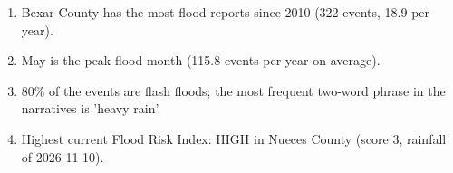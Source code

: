 \begin{enumerate}
\item Bexar County has the most flood reports since 2010 (322 events, 18.9 per year).
\item May is the peak flood month (115.8 events per year on average).
\item 80\% of the events are flash floods; the most frequent two-word phrase in the narratives is 'heavy rain'.
\item Highest current Flood Risk Index: HIGH in Nueces County (score 3, rainfall of 2026-11-10).
\end{enumerate}